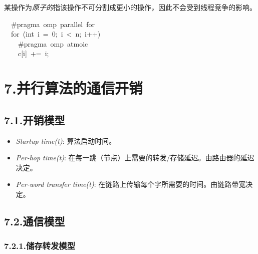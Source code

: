 \documentclass{article}
\begin{document}
\noindent{}某操作为\emph{原子的}指该操作不可分割成更小的操作，因此不会受到线程竞争的影响。%
\begin{mdpre}%
\noindent~~\#pragma~omp~parallel~{for}\\
~~{for}~({int}~i~=~{0};~i~\textless{}~n;~i++)\\
~~~~\#pragma~omp~atmoic\\
~~~~c[i]~+=~i;%
\end{mdpre}
\section{7.\hspace*{0.5em}并行算法的通信开销}\label{section}%

\subsection{7.1.\hspace*{0.5em}开销模型}\label{section}%

\begin{itemize}[noitemsep,topsep=\mdcompacttopsep]%

\item{}\emph{Startup time(t)}: 算法启动时间。%

\item{}\emph{Per-hop time(t)}: 在每一跳（节点）上需要的转发/存储延迟。由路由器的延迟决定。%

\item{}\emph{Per-word transfer time(t)}: 在链路上传输每个字所需要的时间。由链路带宽决定。%
\end{itemize}%

\subsection{7.2.\hspace*{0.5em}通信模型}\label{section}%

\subsubsection{7.2.1.\hspace*{0.5em}储存转发模型}\label{section}%
\end{document}
